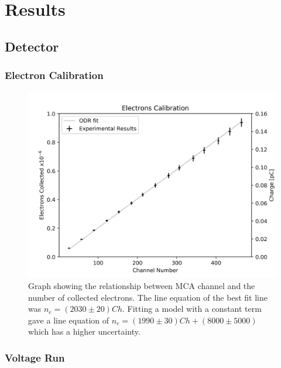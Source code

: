 \chapter{Results}

\section{Detector}

\subsection{Electron Calibration}

\begin{figure}[H]
  \centering
  \includegraphics[width=\linewidth]{electronCalibration.png}
  \caption{Graph showing the relationship between MCA channel and the number of collected electrons. The line equation of the best fit line was $n_{e} = (2030\pm20)Ch$. Fitting a model with a constant term gave a line equation of $n_{e} = (1990\pm30)Ch + (8000\pm5000)$ which has a higher uncertainty.}
  \label{fig:calibration}
\end{figure}

\subsection{Voltage Run}

